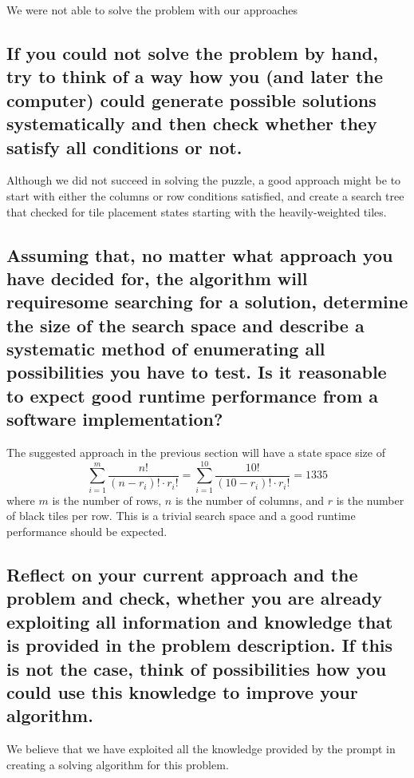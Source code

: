 \documentclass[paper=a4, fontsize=11pt]{scrartcl} %
\numberwithin{figure}{section} %
\numberwithin{table}{section} %
\begin{document}
We were not able to solve the problem with our approaches
\subsection{If you could not solve the problem by hand, try to think of a way how you (and later the computer) could generate possible solutions systematically and then check whether they satisfy all conditions or not.}

Although we did not succeed in solving the puzzle, a good approach might be to start with either the columns or row conditions satisfied, and create a search tree that checked for tile placement states starting with the heavily-weighted tiles.

\subsection{Assuming that, no matter what approach you have decided for, the algorithm will requiresome searching for a solution, determine the size of the search space and describe a systematic method of enumerating all possibilities you have to test. Is it reasonable to expect good runtime performance from a software implementation?}

The suggested approach in the previous section will have a state space size of 
$$\sum_{i=1}^{m}\frac{n!}{(n-r_i)! \cdot r_i!} = \sum_{i=1}^{10}\frac{10!}{(10-r_i)! \cdot r_i!} = 1335$$
where $m$ is the number of rows, $n$ is the number of columns, and $r$ is the number of black tiles per row. This is a trivial search space and a good runtime performance should be expected.

\subsection{Reflect on your current approach and the problem and check, whether you are already exploiting all information and knowledge that is provided in the problem description. If this is not the case, think of possibilities how you could use this knowledge to improve your algorithm.}

We believe that  we have exploited all the knowledge provided by the prompt in creating a solving algorithm for this problem.
\end{document}

